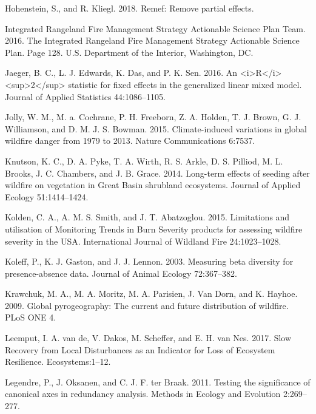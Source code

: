 \documentclass[12pt,]{article}
\begin{document}
\hypertarget{ref-Hohenstein2018}{}
Hohenstein, S., and R. Kliegl. 2018. Remef: Remove partial effects.

\hypertarget{ref-IRMT2016}{}
Integrated Rangeland Fire Management Strategy Actionable Science Plan
Team. 2016. The Integrated Rangeland Fire Management Strategy Actionable
Science Plan. Page 128. U.S. Department of the Interior, Washington, DC.

\hypertarget{ref-Jaeger2017}{}
Jaeger, B. C., L. J. Edwards, K. Das, and P. K. Sen. 2016. An
\textless{}i\textgreater{}R\textless{}/i\textgreater{}
\textless{}sup\textgreater{}2\textless{}/sup\textgreater{} statistic for
fixed effects in the generalized linear mixed model. Journal of Applied
Statistics 44:1086--1105.

\hypertarget{ref-Jolly2015}{}
Jolly, W. M., M. a. Cochrane, P. H. Freeborn, Z. A. Holden, T. J. Brown,
G. J. Williamson, and D. M. J. S. Bowman. 2015. Climate-induced
variations in global wildfire danger from 1979 to 2013. Nature
Communications 6:7537.

\hypertarget{ref-Knutson2014}{}
Knutson, K. C., D. A. Pyke, T. A. Wirth, R. S. Arkle, D. S. Pilliod, M.
L. Brooks, J. C. Chambers, and J. B. Grace. 2014. Long-term effects of
seeding after wildfire on vegetation in Great Basin shrubland
ecosystems. Journal of Applied Ecology 51:1414--1424.

\hypertarget{ref-Kolden2015}{}
Kolden, C. A., A. M. S. Smith, and J. T. Abatzoglou. 2015. Limitations
and utilisation of Monitoring Trends in Burn Severity products for
assessing wildfire severity in the USA. International Journal of
Wildland Fire 24:1023--1028.

\hypertarget{ref-Koleff2003}{}
Koleff, P., K. J. Gaston, and J. J. Lennon. 2003. Measuring beta
diversity for presence-absence data. Journal of Animal Ecology
72:367--382.

\hypertarget{ref-Krawchuk2009a}{}
Krawchuk, M. A., M. A. Moritz, M. A. Parisien, J. Van Dorn, and K.
Hayhoe. 2009. Global pyrogeography: The current and future distribution
of wildfire. PLoS ONE 4.

\hypertarget{ref-VandeLeemput2017}{}
Leemput, I. A. van de, V. Dakos, M. Scheffer, and E. H. van Nes. 2017.
Slow Recovery from Local Disturbances as an Indicator for Loss of
Ecosystem Resilience. Ecosystems:1--12.

\hypertarget{ref-Legendre2011}{}
Legendre, P., J. Oksanen, and C. J. F. ter Braak. 2011. Testing the
significance of canonical axes in redundancy analysis. Methods in
Ecology and Evolution 2:269--277.
\end{document}
